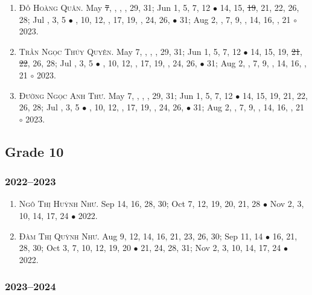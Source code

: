 \documentclass{article}
\begin{document}
\begin{enumerate}
	\item \textsc{Đỗ Hoàng Quân.} May \st{7}, , , , 29, 31; Jun 1, 5, 7, 12 $\bullet$ 14, 15, \st{19}, 21, 22, 26, 28; Jul , 3, 5 $\bullet$ , 10, 12, , 17, 19, , 24, 26,  $\bullet$ 31; Aug 2, , 7, 9, , 14, 16, , 21 $\circ$ 2023.
	\item \textsc{Trần Ngọc Thúy Quyên.} May 7, , , , 29, 31; Jun 1, 5, 7, 12 $\bullet$ 14, 15, 19, \st{21}, \st{22}, 26, 28; Jul , 3, 5 $\bullet$ , 10, 12, , 17, 19, , 24, 26,  $\bullet$ 31; Aug 2, , 7, 9, , 14, 16, , 21 $\circ$ 2023.
	\item \textsc{Đường Ngọc Anh Thư.} May 7, , , , 29, 31; Jun 1, 5, 7, 12 $\bullet$ 14, 15, 19, 21, 22, 26, 28; Jul , 3, 5 $\bullet$ , 10, 12, , 17, 19, , 24, 26,  $\bullet$ 31; Aug 2, , 7, 9, , 14, 16, , 21 $\circ$ 2023.
\end{enumerate}


\subsection{Grade 10}

\subsubsection{2022--2023}

\begin{enumerate}
	\item \textsc{Ngô Thị Huỳnh Như.} {\sf[In]} Sep 14, 16, 28, 30; Oct 7, 12, 19, 20, 21, 28 $\bullet$ Nov 2, 3, 10, 14, 17, 24 $\bullet$ 2022. {\sf[Out]}
	\item \textsc{Đàm Thị Quỳnh Như.} {\sf[In]} Aug 9, 12, 14, 16, 21, 23, 26, 30; Sep 11, 14 $\bullet$ 16, 21, 28, 30; Oct 3, 7, 10, 12, 19, 20 $\bullet$ 21, 24, 28, 31; Nov 2, 3, 10, 14, 17, 24 $\bullet$ 2022. {\sf[Out]}
\end{enumerate}

\subsubsection{2023--2024}

\end{document}
